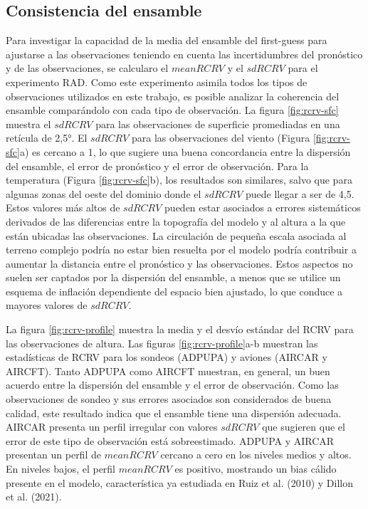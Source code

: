 \documentclass[12pt,oneside]{reedthesis}
\begin{document}
\hypertarget{consistencia-del-ensamble}{%
\subsection{Consistencia del ensamble}\label{consistencia-del-ensamble}}

Para investigar la capacidad de la media del ensamble del first-guess para ajustarse a las observaciones teniendo en cuenta las incertidumbres del pronóstico y de las observaciones, se calcularo el \(meanRCRV\) y el \(sdRCRV\) para el experimento RAD. Como este experimento asimila todos los tipos de observaciones utilizados en este trabajo, es posible analizar la coherencia del ensamble comparándolo con cada tipo de observación. La figura \ref{fig:rcrv-sfc} muestra el \(sdRCRV\) para las observaciones de superficie promediadas en una retícula de 2,5°. El \(sdRCRV\) para las observaciones del viento (Figura \ref{fig:rcrv-sfc}a) es cercano a 1, lo que sugiere una buena concordancia entre la dispersión del ensamble, el error de pronóstico y el error de observación. Para la temperatura (Figura \ref{fig:rcrv-sfc}b), los resultados son similares, salvo que para algunas zonas del oeste del dominio donde el \(sdRCRV\) puede llegar a ser de 4,5. Estos valores más altos de \(sdRCRV\) pueden estar asociados a errores sistemáticos derivados de las diferencias entre la topografía del modelo y al altura a la que están ubicadas las observaciones. La circulación de pequeña escala asociada al terreno complejo podría no estar bien resuelta por el modelo podría contribuir a aumentar la distancia entre el pronóstico y las observaciones. Estos aspectos no suelen ser captados por la dispersión del ensamble, a menos que se utilice un esquema de inflación dependiente del espacio bien ajustado, lo que conduce a mayores valores de \(sdRCRV\).

La figura \ref{fig:rcrv-profile} muestra la media y el desvío estándar del RCRV para las observaciones de altura. Las figuras \ref{fig:rcrv-profile}a-b muestran las estadísticas de RCRV para los sondeos (ADPUPA) y aviones (AIRCAR y AIRCFT). Tanto ADPUPA como AIRCFT muestran, en general, un buen acuerdo entre la dispersión del ensamble y el error de observación. Como las observaciones de sondeo y sus errores asociados son considerados de buena calidad, este resultado indica que el ensamble tiene una dispersión adecuada. AIRCAR presenta un perfil irregular con valores \(sdRCRV\) que sugieren que el error de este tipo de observación está sobreestimado. ADPUPA y AIRCAR presentan un perfil de \(meanRCRV\) cercano a cero en los niveles medios y altos. En niveles bajos, el perfil \(meanRCRV\) es positivo, mostrando un bias cálido presente en el modelo, característica ya estudiada en Ruiz et al. (2010) y Dillon et al. (2021).
\end{document}
